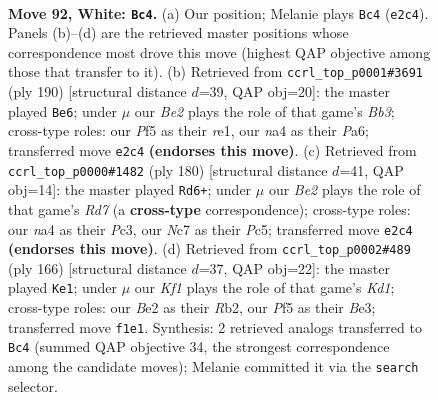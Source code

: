 \documentclass[11pt]{article}
\begin{document}
\clearpage

\begin{figure}[p]\centering
\begin{subfigure}{0.46\textwidth}\centering
\resizebox{\linewidth}{!}{%
\newchessgame
\chessboard[
  setfen={8/2N3R1/8/5P2/np2bkP1/8/4B3/5K2 w - - 6 92},
  showmover=false,
  pgfstyle=straightmove, color=movearrow, markmove={e2-c4}
]}
\caption{}
\end{subfigure}\hfill
\begin{subfigure}{0.46\textwidth}\centering
\resizebox{\linewidth}{!}{%
\newchessgame
\chessboard[
  setfen={8/b2K4/P5p1/6k1/R5P1/1B6/8/4r3 w - - 36 96},
  showmover=false,
  pgfstyle=straightmove, color=movearrow, markmove={b3-e6}
]}
\caption{}
\end{subfigure}
\\[4pt]
\begin{subfigure}{0.46\textwidth}\centering
\resizebox{\linewidth}{!}{%
\newchessgame
\chessboard[
  setfen={8/3R1P1n/2n2k2/2PB4/8/2P5/2K2P2/8 w - - 5 91},
  showmover=false,
  pgfstyle=straightmove, color=movearrow, markmove={d7-d6}
]}
\caption{}
\end{subfigure}\hfill
\begin{subfigure}{0.46\textwidth}\centering
\resizebox{\linewidth}{!}{%
\newchessgame
\chessboard[
  setfen={8/8/6p1/2P5/2r1b3/4Bk2/1R3P2/3K4 w - - 53 84},
  showmover=false,
  pgfstyle=straightmove, color=movearrow, markmove={d1-e1}
]}
\caption{}
\end{subfigure}
\caption{\textbf{Move 92, White: \texttt{Bc4}.} (a) Our position; Melanie plays \texttt{Bc4} (\texttt{e2c4}). Panels (b)--(d) are the retrieved master positions whose correspondence most drove this move (highest QAP objective among those that transfer to it). (b) Retrieved from \texttt{ccrl\_top\_p0001\#3691} (ply 190) [structural distance $d$=39, QAP obj=20]: the master played \texttt{Be6}; under $\mu$ our \emph{Be2} plays the role of that game's \emph{Bb3}; cross-type roles: our \emph{P}f5 as their \emph{r}e1, our \emph{n}a4 as their \emph{P}a6; transferred move \texttt{e2c4} \textbf{(endorses this move)}. (c) Retrieved from \texttt{ccrl\_top\_p0000\#1482} (ply 180) [structural distance $d$=41, QAP obj=14]: the master played \texttt{Rd6+}; under $\mu$ our \emph{Be2} plays the role of that game's \emph{Rd7} (a \textbf{cross-type} correspondence); cross-type roles: our \emph{n}a4 as their \emph{P}c3, our \emph{N}c7 as their \emph{P}c5; transferred move \texttt{e2c4} \textbf{(endorses this move)}. (d) Retrieved from \texttt{ccrl\_top\_p0002\#489} (ply 166) [structural distance $d$=37, QAP obj=22]: the master played \texttt{Ke1}; under $\mu$ our \emph{Kf1} plays the role of that game's \emph{Kd1}; cross-type roles: our \emph{B}e2 as their \emph{R}b2, our \emph{P}f5 as their \emph{B}e3; transferred move \texttt{f1e1}. Synthesis: 2 retrieved analogs transferred to \texttt{Bc4} (summed QAP objective 34, the strongest correspondence among the candidate moves); Melanie committed it via the \texttt{search} selector.}
\label{fig:thought-m182}
\end{figure}
\end{document}
